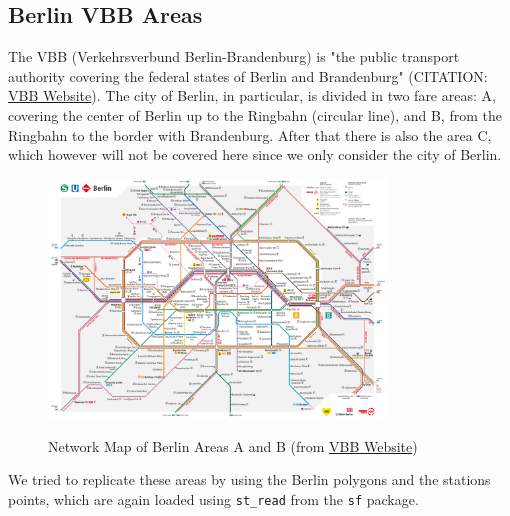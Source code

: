 \begin{figure}[H]
\centering
\end{figure}

\subsection{Berlin VBB Areas}

The VBB (Verkehrsverbund Berlin-Brandenburg) is "the public transport authority covering the federal states of Berlin and Brandenburg" (CITATION: \href{https://www.vbb.de/en/about-us/the-company-vbb}{VBB Website}). The city of Berlin, in particular, is divided in two fare areas: A, covering the center of Berlin up to the Ringbahn (circular line), and B, from the Ringbahn to the border with Brandenburg. After that there is also the area C, which however will not be covered here since we only consider the city of Berlin.

\begin{figure}[H]
\begin{center}
\includegraphics[width=0.8\textwidth, keepaspectratio]{S_und_U-Bahnnetz_mit_Regionalbahn_Innenstadt.pdf} \\
\caption{Network Map of Berlin Areas A and B (from \href{https://www.vbb.de/en/timetables/network-maps}{VBB Website})}
\end{center}
\end{figure}

We tried to replicate these areas by using the Berlin polygons and the stations points, which are again loaded using \texttt{st\_read} from the \texttt{sf} package.



